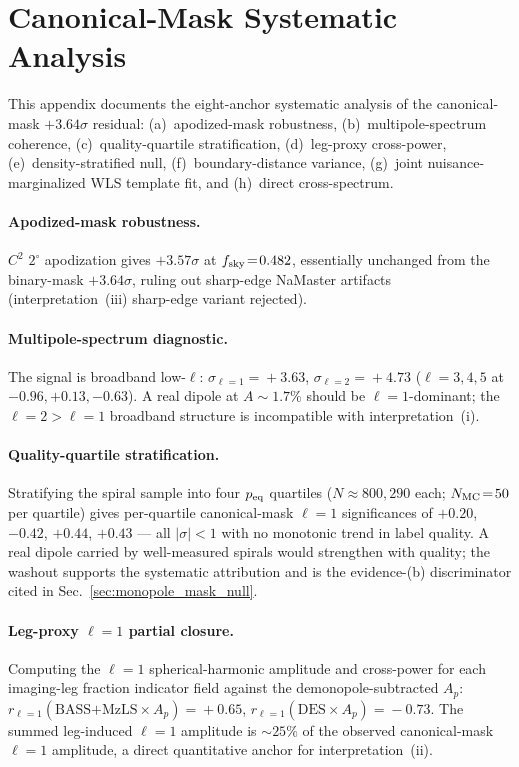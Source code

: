 \documentclass[aps,prd,twocolumn,superscriptaddress,preprintnumbers,nofootinbib,longbibliography,floatfix]{revtex4-2}
\newcommand{\sigmaunit}{\sigma}
\begin{document}
\section{Canonical-Mask Systematic Analysis}
\label{sec:app_systematic}

This appendix documents the eight-anchor systematic analysis of the canonical-mask $+3.64\sigmaunit$ residual: (a)~apodized-mask robustness, (b)~multipole-spectrum coherence, (c)~quality-quartile stratification, (d)~leg-proxy cross-power, (e)~density-stratified null, (f)~boundary-distance variance, (g)~joint nuisance-marginalized WLS template fit, and (h)~direct cross-spectrum.

\paragraph{Apodized-mask robustness.}
$C^2$ $2^\circ$ apodization gives $+3.57\sigmaunit$ at $f_{\rm sky}\!=\!0.482$, essentially unchanged from the binary-mask $+3.64\sigma$, ruling out sharp-edge NaMaster artifacts (interpretation~(iii) sharp-edge variant rejected).

\paragraph{Multipole-spectrum diagnostic.}
The signal is broadband low-$\ell$: $\sigma_{\ell=1}\!=\!+3.63$, $\sigma_{\ell=2}\!=\!+4.73$ ($\ell=3,4,5$ at $-0.96,+0.13,-0.63$). A real dipole at $A\!\sim\!1.7\%$ should be $\ell\!=\!1$-dominant; the $\ell\!=\!2\!>\!\ell\!=\!1$ broadband structure is incompatible with interpretation~(i).

\paragraph{Quality-quartile stratification.}
Stratifying the spiral sample into four $p_{\rm eq}$ quartiles ($N\!\approx\!800{,}290$ each; $N_{\rm MC}\!=\!50$ per quartile) gives per-quartile canonical-mask $\ell\!=\!1$ significances of $+0.20$, $-0.42$, $+0.44$, $+0.43$ --- all $|\sigma|\!<\!1$ with no monotonic trend in label quality. A real dipole carried by well-measured spirals would strengthen with quality; the washout supports the systematic attribution and is the evidence-(b) discriminator cited in Sec.~\ref{sec:monopole_mask_null}.

\paragraph{Leg-proxy $\ell\!=\!1$ partial closure.}
Computing the $\ell\!=\!1$ spherical-harmonic amplitude and cross-power for each imaging-leg fraction indicator field against the demonopole-subtracted $A_p$: $r_{\ell=1}(\text{BASS+MzLS}\!\times\!A_p)\!=\!+0.65$, $r_{\ell=1}(\text{DES}\!\times\!A_p)\!=\!-0.73$. The summed leg-induced $\ell\!=\!1$ amplitude is $\sim\!25\%$ of the observed canonical-mask $\ell\!=\!1$ amplitude, a direct quantitative anchor for interpretation~(ii).
\end{document}
